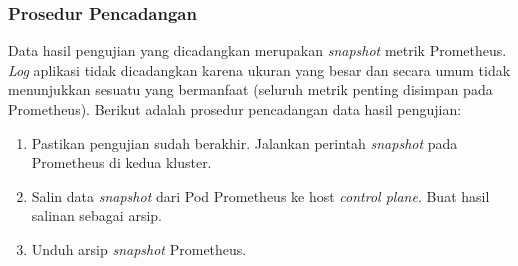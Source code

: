 \subsubsection{Prosedur Pencadangan}

Data hasil pengujian yang dicadangkan merupakan \textit{snapshot} metrik Prometheus. \textit{Log} aplikasi tidak dicadangkan karena ukuran yang besar dan secara umum tidak menunjukkan sesuatu yang bermanfaat (seluruh metrik penting disimpan pada Prometheus). Berikut adalah prosedur pencadangan data hasil pengujian:

\begin{enumerate}
    \item Pastikan pengujian sudah berakhir. Jalankan perintah \textit{snapshot} pada Prometheus di kedua kluster.
    \item Salin data \textit{snapshot} dari Pod Prometheus ke host \textit{control plane}. Buat hasil salinan sebagai arsip.
    \item Unduh arsip \textit{snapshot} Prometheus.
\end{enumerate}
